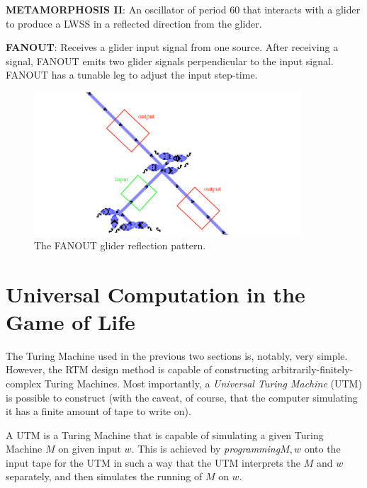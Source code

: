 \documentclass{article}
\begin{document}
\vspace{1em}

\noindent\textbf{METAMORPHOSIS II}: An oscillator of period 60 that interacts with a glider to produce a LWSS in a reflected direction from the glider.

\vspace{1em}

\noindent\textbf{FANOUT}: Receives a glider input signal from one source. After receiving a signal, FANOUT emits two glider signals perpendicular to the input signal. FANOUT has a tunable leg to adjust the input step-time.

\vspace{1em}

\begin{figure}[h]
\centering
\includegraphics[width=10cm,keepaspectratio]{images/FANOUT.png}
\captionsetup{labelformat=empty} \caption{The FANOUT glider reflection pattern.}
\end{figure}
\section{Universal Computation in the Game of Life}


The Turing Machine used in the previous two sections is, notably, very simple. However, the RTM design method is capable of constructing arbitrarily-finitely-complex Turing Machines. Most importantly, a \textit{Universal Turing Machine} (UTM) is possible to construct (with the caveat, of course, that the computer simulating it has a finite amount of tape to write on).





A UTM is a Turing Machine that is capable of simulating a given Turing Machine $  M  $ on given input $  w  $. This is achieved by \textit{programming}$  M, w  $ onto the input tape for the UTM in such a way that the UTM interprets the $  M  $ and $  w  $ separately, and then simulates the running of $  M  $ on $  w  $.
\end{document}
